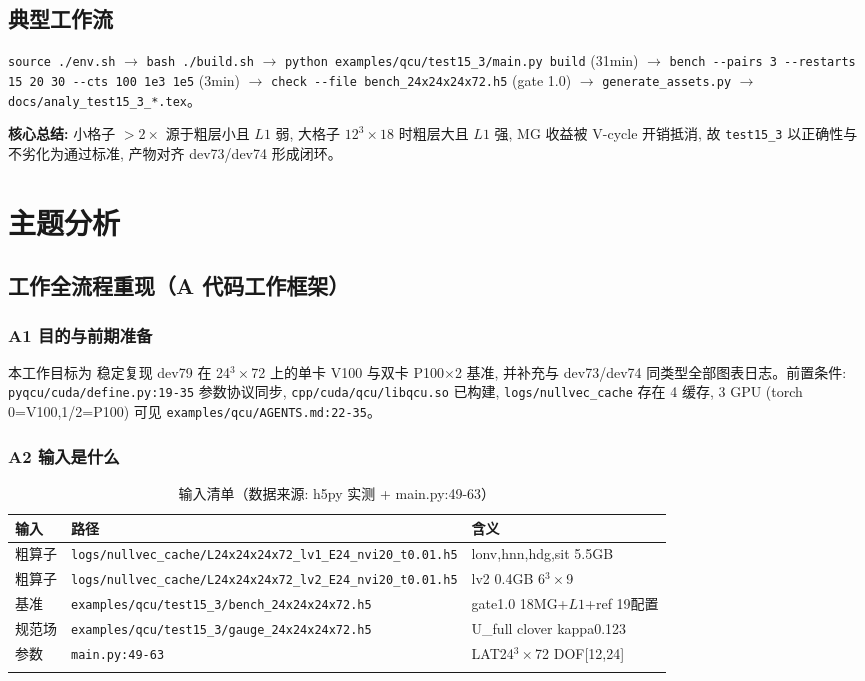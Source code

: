 \documentclass[UTF8]{ctexart}
\begin{document}
\subsection{典型工作流}
\texttt{\nolinkurl{source ./env.sh}} $\to$ \texttt{\nolinkurl{bash ./build.sh}} $\to$ \texttt{\nolinkurl{python examples/qcu/test15_3/main.py build}} (31min) $\to$ \texttt{\nolinkurl{bench --pairs 3 --restarts 15 20 30 --cts 100 1e3 1e5}} (3min) $\to$ \texttt{\nolinkurl{check --file bench_24x24x24x72.h5}} (gate 1.0) $\to$ \texttt{\nolinkurl{generate_assets.py}} $\to$ \texttt{\nolinkurl{docs/analy_test15_3_*.tex}}。

\begin{ideabox}
\textbf{核心总结:} 小格子 $>2\times$ 源于粗层小且 $L1$ 弱, 大格子 $12^3\times18$ 时粗层大且 $L1$ 强, MG 收益被 V-cycle 开销抵消, 故 \texttt{\nolinkurl{test15_3}} 以正确性与不劣化为通过标准, 产物对齐 dev73/dev74 形成闭环。
\end{ideabox}

\section{主题分析}
\subsection{工作全流程重现（A 代码工作框架）}

\subsubsection{A1 目的与前期准备}
本工作目标为 \textcolor{struct}{稳定复现 dev79 在 24$^3\times$72 上的单卡 V100 与双卡 P100$\times$2 基准, 并补充与 dev73/dev74 同类型全部图表日志}。前置条件: \texttt{\nolinkurl{pyqcu/cuda/define.py:19-35}} 参数协议同步, \texttt{\nolinkurl{cpp/cuda/qcu/libqcu.so}} 已构建, \texttt{\nolinkurl{logs/nullvec_cache}} 存在 4 缓存, 3 GPU (torch 0=V100,1/2=P100) 可见 \textcolor{evidence}{\texttt{\nolinkurl{examples/qcu/AGENTS.md:22-35}}}。

\subsubsection{A2 输入是什么}
\begin{xltabular}{\textwidth}{lXl}
\toprule
输入 & 路径 & 含义 \\
\midrule
\endhead
粗算子 & \texttt{\nolinkurl{logs/nullvec_cache/L24x24x24x72_lv1_E24_nvi20_t0.01.h5}} & lonv,hnn,hdg,sit 5.5GB \\
粗算子 & \texttt{\nolinkurl{logs/nullvec_cache/L24x24x24x72_lv2_E24_nvi20_t0.01.h5}} & lv2 0.4GB 6$^3\times$9 \\
基准 & \texttt{\nolinkurl{examples/qcu/test15_3/bench_24x24x24x72.h5}} & gate1.0 18MG+$L1$+ref 19配置 \\
规范场 & \texttt{\nolinkurl{examples/qcu/test15_3/gauge_24x24x24x72.h5}} & U\_full clover kappa0.123 \\
参数 & \texttt{\nolinkurl{main.py:49-63}} & LAT24$^3\times$72 DOF[12,24] \\
\bottomrule
\caption{输入清单（数据来源: h5py 实测 + main.py:49-63）}
\end{xltabular}
\end{document}
